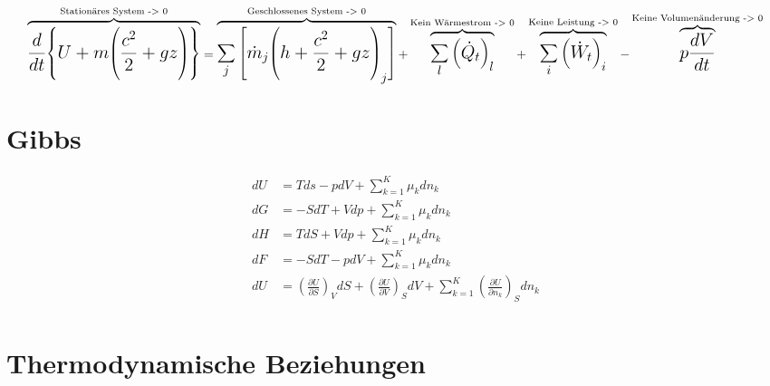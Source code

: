 \documentclass[twocolumn]{article}
\begin{document}
\begin{equation*}
\Large
	\overbrace{
	\frac{d}{dt}\Bigg{\{} U 
	+
	m \Bigg{(}\frac{c^2}{2}+gz\Bigg{)}\Bigg{\}}}
	^{\text{Stationäres System -> 0}} 
	=
	\overbrace{
	\sum_{j}{\Bigg{[}\dot{m}_j\Bigg{(}h+\frac{c^2}{2}+gz\Bigg{)}_j \Bigg{]}}}
	^{\text{Geschlossenes System -> 0}}  
	+
	\overbrace{
	\sum_{l}^{} \Big(\dot{Q}_t\Big)_l}
	^{\text{Kein Wärmestrom -> 0}} 
	+
	\overbrace{
	\sum_{i}\Big(\dot{W}_t\Big)_i}
	^{\text{Keine Leistung -> 0}}
	-
	\overbrace{
	p\frac{dV}{dt}}
	^{\text{Keine Volumenänderung -> 0}}
\end{equation*}
\section{Gibbs}

\begin{align*}
	dU &=  Tds - pdV + \sum_{k=1}^{K} \mu_k dn_k \\
	dG &= -SdT + Vdp + \sum_{k=1}^{K} \mu_k dn_k \\
	dH &=  TdS + Vdp + \sum_{k=1}^{K} \mu_k dn_k \\
	dF &= -SdT - pdV + \sum_{k=1}^{K} \mu_k dn_k \\
	dU &= 	\left(\frac{\partial U}{\partial S}\right)_{V} dS 
	+ 	\left(\frac{\partial U}{\partial V}\right)_{S} dV 
	+ 	\sum_{k=1}^{K} \left(\frac{\partial U}{\partial n_k}\right)_{S} dn_k  \\
\end{align*}


\section{Thermodynamische Beziehungen}
\end{document}
